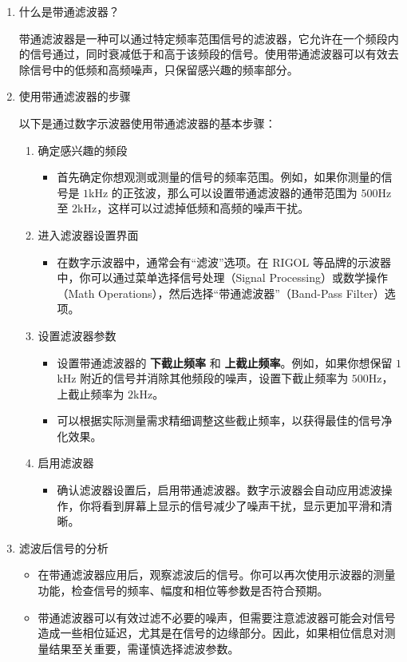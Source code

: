 \begin{enumerate}
	\item 什么是带通滤波器？
	
	带通滤波器是一种可以通过特定频率范围信号的滤波器，它允许在一个频段内的信号通过，同时衰减低于和高于该频段的信号。使用带通滤波器可以有效去除信号中的低频和高频噪声，只保留感兴趣的频率部分。
	
	\item 使用带通滤波器的步骤
	
	以下是通过数字示波器使用带通滤波器的基本步骤：
	
	\begin{enumerate}
		\item 确定感兴趣的频段
		\begin{itemize}
			\item 首先确定你想观测或测量的信号的频率范围。例如，如果你测量的信号是 $1$kHz 的正弦波，那么可以设置带通滤波器的通带范围为 $500$Hz 至 $2$kHz，这样可以过滤掉低频和高频的噪声干扰。
		\end{itemize}
		
		\item 进入滤波器设置界面
		\begin{itemize}
			\item 在数字示波器中，通常会有“滤波”选项。在 RIGOL 等品牌的示波器中，你可以通过菜单选择信号处理（Signal Processing）或数学操作（Math Operations），然后选择“带通滤波器”（Band-Pass Filter）选项。
		\end{itemize}
		
		\item 设置滤波器参数
		\begin{itemize}
			\item 设置带通滤波器的 \textbf{下截止频率} 和 \textbf{上截止频率}。例如，如果你想保留 $1$kHz 附近的信号并消除其他频段的噪声，设置下截止频率为 $500$Hz，上截止频率为 $2$kHz。
			\item 可以根据实际测量需求精细调整这些截止频率，以获得最佳的信号净化效果。
		\end{itemize}
		
		\item 启用滤波器
		\begin{itemize}
			\item 确认滤波器设置后，启用带通滤波器。数字示波器会自动应用滤波操作，你将看到屏幕上显示的信号减少了噪声干扰，显示更加平滑和清晰。
		\end{itemize}
	\end{enumerate}
	
	\item 滤波后信号的分析
	\begin{itemize}
		\item 在带通滤波器应用后，观察滤波后的信号。你可以再次使用示波器的测量功能，检查信号的频率、幅度和相位等参数是否符合预期。
		\item 带通滤波器可以有效过滤不必要的噪声，但需要注意滤波器可能会对信号造成一些相位延迟，尤其是在信号的边缘部分。因此，如果相位信息对测量结果至关重要，需谨慎选择滤波参数。
	\end{itemize}
\end{enumerate}

